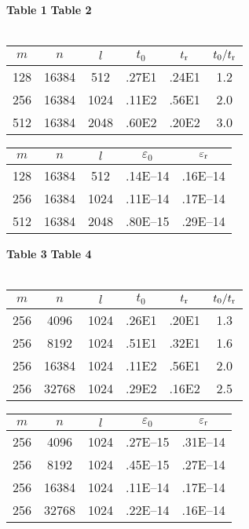 \documentclass[letterpaper,12pt]{article}
\def\epsilon{\varepsilon}
\begin{document}
\begin{table}
\hfil {\bf Table 1} \hfil\hfil {\bf Table 2} \hfil \\\vspace{-.75em}\\
\begin{tabular}{c|c|c|c|c|c}
$m$ &   $n$ &  $l$ & $t_0$ & $t_{\rm r}$ & $t_0/t_{\rm r}$ \\\hline
128 & 16384 &  512 & .27E1 &       .24E1 &             1.2 \\
256 & 16384 & 1024 & .11E2 &       .56E1 &             2.0 \\
512 & 16384 & 2048 & .60E2 &       .20E2 &             3.0 \\
\end{tabular}
\hfil
\begin{tabular}{c|c|c|c|c}
$m$ &   $n$ &  $l$ & $\epsilon_0$ & $\epsilon_{\rm r}$ \\\hline
128 & 16384 &  512 &     .14E--14 &           .16E--14 \\
256 & 16384 & 1024 &     .11E--14 &           .17E--14 \\
512 & 16384 & 2048 &     .80E--15 &           .29E--14 \\
\end{tabular}

\bigskip
\bigskip

\hfil {\bf Table 3} \hfil\hfil {\bf Table 4} \hfil \\\vspace{-.75em}\\
\begin{tabular}{c|c|c|c|c|c}
$m$ &   $n$ &  $l$ & $t_0$ & $t_{\rm r}$ & $t_0/t_{\rm r}$ \\\hline
256 &  4096 & 1024 & .26E1 &       .20E1 &             1.3 \\
256 &  8192 & 1024 & .51E1 &       .32E1 &             1.6 \\
256 & 16384 & 1024 & .11E2 &       .56E1 &             2.0 \\
256 & 32768 & 1024 & .29E2 &       .16E2 &             2.5 \\
\end{tabular}
\hfil
\begin{tabular}{c|c|c|c|c}
$m$ &   $n$ &  $l$ & $\epsilon_0$ & $\epsilon_{\rm r}$ \\\hline
256 &  4096 & 1024 &     .27E--15 &           .31E--14 \\
256 &  8192 & 1024 &     .45E--15 &           .27E--14 \\
256 & 16384 & 1024 &     .11E--14 &           .17E--14 \\
256 & 32768 & 1024 &     .22E--14 &           .16E--14 \\
\end{tabular}

\bigskip
\end{table}
\end{document}
